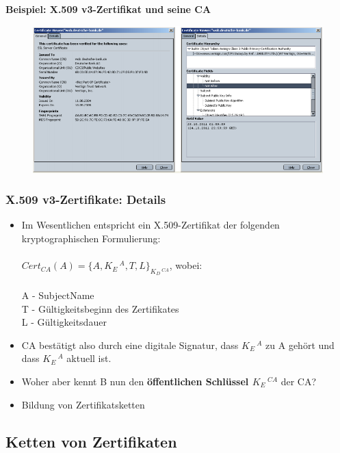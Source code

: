 \documentclass[openany]{book}
\begin{document}
\textbf{Beispiel: X.509 v3-Zertifikat und seine CA}

\begin{figure}[h!]
    \centering
    \includegraphics[width=\linewidth]{Pics/X509.PNG}
\end{figure} 

\subsubsection{X.509 v3-Zertifikate: Details}

\begin{itemize}
    \item Im Wesentlichen entspricht ein X.509-Zertifikat der folgenden kryptographischen Formulierung: \\ \\ $Cert_{CA} (A)=\{ A,K_E\, ^A,T,L\}_{K_D\, ^{CA}}$, wobei: \\ \\ A - SubjectName \\ T - Gültigkeitsbeginn des Zertifikates \\ L - Gültigkeitsdauer
    \item CA bestätigt also durch eine digitale Signatur, dass $K_E\, ^A$ zu A gehört und dass $K_E\, ^A$ aktuell ist.
    \item Woher aber kennt B nun den \textbf{öffentlichen Schlüssel $K_E \, ^{CA}$} der CA?
    \item Bildung von Zertifikatsketten 
\end{itemize}

\subsection{Ketten von Zertifikaten}
\end{document}
